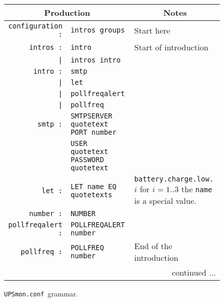 \documentclass[12pt]{article}
\newcommand{\UPSmonconf}{\textcolor{UPSMONCOLOUR}{\texttt{UPSmon.conf}}}
\begin{document}
\begin{figure}[ht]
\begin{center}
\begin{tabular}{|rp{0.55\LinePrinterwidth}|p{0.3\LinePrinterwidth}|}
\hline
\multicolumn{2}{|c|}{\textbf{Production}} & \multicolumn{1}{|c|}{\textbf{Notes}} \\ \hline\hline
\texttt{configuration :}   & \texttt{intros groups} & Start here \\ \hline\hline
\texttt{intros :}          & \texttt{intro} & Start of introduction \\
       \texttt{|}          & \texttt{intros intro} & \\ \hline
\texttt{intro :}           & \texttt{smtp} & \\
      \texttt{|}           & \texttt{let} & \\
      \texttt{|}           & \texttt{pollfreqalert} & \\
      \texttt{|}           & \texttt{pollfreq} & \\ \hline
\texttt{smtp :}            & \texttt{SMTPSERVER quotetext PORT number} & \\
                           & \texttt{USER quotetext PASSWORD quotetext} & \\ \hline
\texttt{let :}             & \texttt{LET name EQ quotetexts} 
                           & \texttt{battery.charge.low.}$i$ for $i=1..3$
                             the \texttt{name} is a special value.\\ \hline
\texttt{number :}          & \texttt{NUMBER} & \\ \hline
\texttt{pollfreqalert :}   & \texttt{POLLFREQALERT number} & \\ \hline
\texttt{pollfreq :}        & \texttt{POLLFREQ number} & End of the introduction \\ \hline\hline
\multicolumn{3}{|r|}{\small continued ...} \\ \hline
\end{tabular}
\caption{\UPSmonconf\ grammar.\label{fig:yacc}}
\end{center}
\end{figure}
\end{document}
